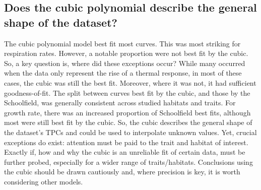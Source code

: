 \documentclass[11pt]{article}
\begin{document}
\subsection*{Does the cubic polynomial describe the general shape of the dataset?}
The cubic polynomial model best fit most curves. %
This was most striking for respiration rates.
However, a notable proportion were not best fit by the cubic. So, a key question is, where did these exceptions occur?
While many occurred when the data only represent the rise of a thermal response, in most of these cases, the cubic was still the best fit.
Moreover, where it was not, it had sufficient goodness-of-fit.
The split between curves best fit by the cubic, and those by the Schoolfield, was generally consistent across studied habitats and traits. For growth rate, there was an increased proportion of Schoolfield best fits, although most were still best fit by the cubic.
So, the cubic describes the general shape of the dataset's TPCs and could be used to interpolate unknown values. %
Yet, crucial exceptions do exist: attention must be paid to the trait and habitat of interest.
Exactly if, how and why the cubic is an unreliable fit of certain data, must be further probed, especially for a wider range of traits/habitats. Conclusions using the cubic should be drawn cautiously and, where precision is key, it is worth considering other models.


\end{document}
